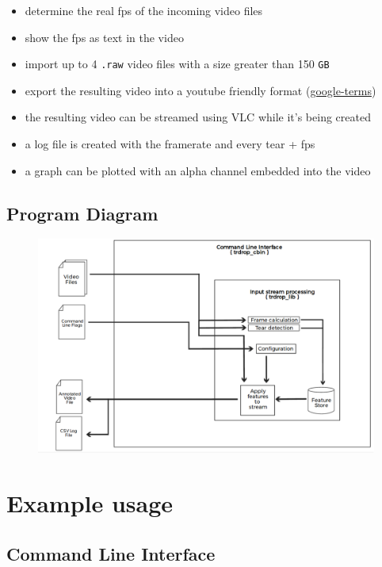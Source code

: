 \documentclass[titlepage]{article}
\begin{document}
\begin{itemize}
    \item determine the real fps of the incoming video files
    \item show the fps as text in the video
    \item import up to 4 \texttt{.raw} video files with a size greater than 150 \texttt{GB}
    \item export the resulting video into a youtube friendly format (\href{https://support.google.com/youtube/answer/1722171}{google-terms})
    \item the resulting video can be streamed using VLC while it's being created
    \item a log file is created with the framerate and every tear + fps
    \item a graph can be plotted with an alpha channel embedded into the video
\end{itemize}

\subsection{Program Diagram}

\begin{figure}[H]
\hspace{-30mm}
\includegraphics[width=500pt,left]{../../images/trdrop_diagram.eps}
\end{figure}

\section{Example usage}

\subsection{Command Line Interface}
\end{document}
